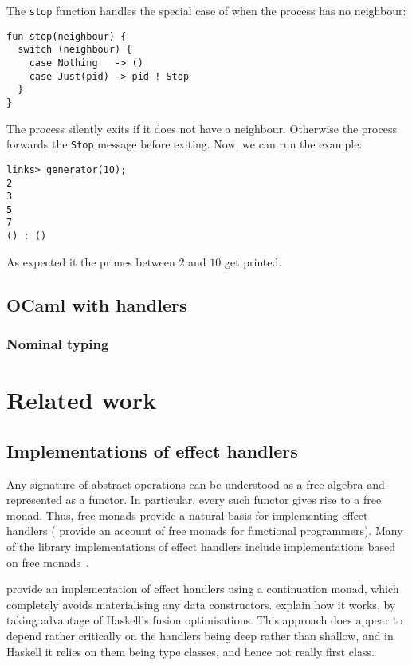 \documentclass[12pt,mscres,cdtppar,twoside,openright,logo,rightchapter,normalheadings]{infthesis}
\theoremstyle{definition}
\begin{document}
%
The \lstinline$stop$ function handles the special case of when the
process has no neighbour:
%
\begin{lstlisting}
fun stop(neighbour) {
  switch (neighbour) {
    case Nothing   -> ()
    case Just(pid) -> pid ! Stop
  }
}
\end{lstlisting}
%
The process silently exits if it does not have a neighbour. Otherwise
the process forwards the \lstinline$Stop$ message before exiting. Now,
we can run the example:
\begin{lstlisting}
links> generator(10);
2
3
5
7
() : ()
\end{lstlisting}
%
As expected it the primes between $2$ and $10$ get printed.


\section{OCaml with handlers}
\label{sec:ocaml-handlers}

\subsection{Nominal typing}

\chapter{Related work}
\label{ch:related-work}

\section{Implementations of effect handlers}
Any signature of abstract operations can be understood as a free
algebra and represented as a functor. In particular, every such
functor gives rise to a free monad. Thus, free monads provide a
natural basis for implementing effect handlers (\citet{Swierstra2008b}
provide an account of free monads for functional programmers).  Many
of the library implementations of effect handlers include
implementations based on free monads~\citep{Kammar2013, Kiselyov2013,
  Kiselyov2015, Brady2013, Wu2014}.

\citet{Kammar2013} provide an implementation of effect handlers using
a continuation monad, which completely avoids materialising any data
constructors. \citet{Wu2015} explain how it works, by taking advantage
of Haskell's fusion optimisations. This approach does appear to depend
rather critically on the handlers being deep rather than shallow, and
in Haskell it relies on them being type classes, and hence not really
first class.
\end{document}
